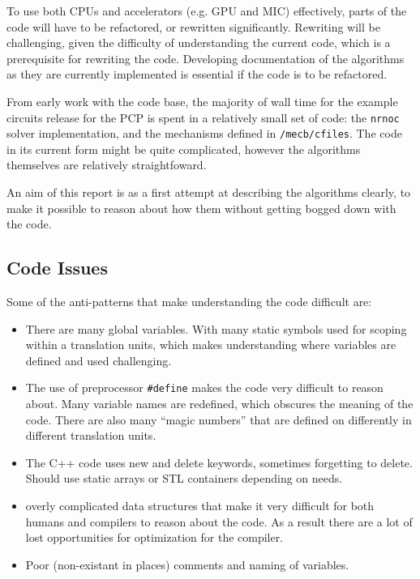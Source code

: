 \documentclass[11pt,a4paper]{article}
\newcommand{\lst}[1]{\lstinline!#1!} %
\begin{document}
To use both CPUs and accelerators (e.g. GPU and MIC) effectively, parts of the code will have to be refactored, or rewritten significantly. Rewriting will be challenging, given the difficulty of understanding the current code, which is a prerequisite for rewriting the code. Developing documentation of the algorithms as they are currently implemented is essential if the code is to be refactored.

From early work with the code base, the majority of wall time for the example circuits release for the PCP is spent in a relatively small set of code: the \lst{nrnoc} solver implementation, and the mechanisms defined in \lst{/mecb/cfiles}. The code in its current form might be quite complicated, however the algorithms themselves are relatively straightfoward.

An aim of this report is as a first attempt at describing the algorithms clearly, to make it possible to reason about how them without getting bogged down with the code.

\subsection{Code Issues}
Some of the anti-patterns that make understanding the code difficult are:
\begin{itemize}
    \item
        There are many global variables. With many static symbols used for scoping within a translation units, which makes understanding where variables are defined and used challenging.
    \item
        The use of preprocessor \lst{#define} makes the code very difficult to reason about. Many variable names are redefined, which obscures the meaning of the code. There are also many ``magic numbers'' that are defined on differently in different translation units.
    \item
        The C++ code uses new and delete keywords, sometimes forgetting to delete. Should use static arrays or STL containers depending on needs.
    \item
        overly complicated data structures that make it very difficult for both humans and compilers to reason about the code. As a result there are a lot of lost opportunities for optimization for the compiler.
    \item
        Poor (non-existant in places) comments and naming of variables.
\end{itemize}
\end{document}
